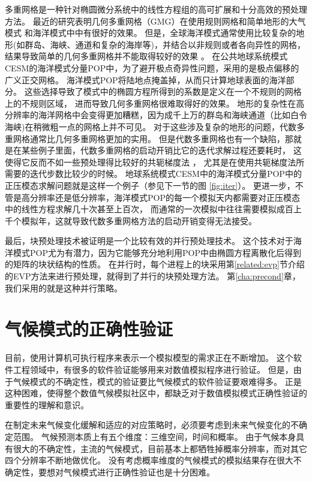 多重网格是一种针对椭圆微分系统中的线性方程组的高可扩展和十分高效的预处理方法。 
最近的研究表明几何多重网格（GMG）在使用规则网格和简单地形的大气模式
 \cite{muller2014massively}和海洋模式中\cite{matsumura2008non,kanarska2007algorithm}中有很好的效果。 
但是，全球海洋模式通常使用比较复杂的地形(如群岛、海峡、通道和复杂的海岸等)，并结合以非规则或者各向异性的网格， 结果导致简单的几何多重网格并不能取得较好的效果
\cite{matsumura2008non,fulton1986multigrid,tseng2003ghost,stuben2001review}。 
在公共地球系统模式CESM的海洋模式分量POP中，为了避开极点奇异性问题，采用的是极点偏移的广义正交网格。 
海洋模式POP将陆地点掩盖掉，从而只计算地球表面的海洋部分。
这些选择导致了模式中的椭圆方程所得到的系数是定义在一个不规则的网格上的不规则区域， 进而导致几何多重网格很难取得好的效果。 
地形的复杂性在高分辨率的海洋网格中会变得更加糟糕，因为成千上万的群岛和海峡通道（比如白令海峡)在稍微粗一点的网格上并不可见。
对于这些涉及复杂的地形的问题，代数多重网格通常比几何多重网格更加的实用。 
但是代数多重网格也有一个缺陷，那就是在某些例子里面，代数多重网格的启动开销比它的迭代求解过程还要耗时，
这使得它反而不如一些预处理得比较好的共轭梯度法
\cite{muller2014massively}， 尤其是在使用共轭梯度法所需要的迭代步数比较少的时候。 
地球系统模式CESM中的海洋模式分量POP中的正压模态求解问题就是这样一个例子（参见下一节的图
 \ref{fig:iter}）。
更进一步，不管是高分辨率还是低分辨率，海洋模式POP的每一个模拟天内都需要对正压模态中的线性方程求解几十次甚至上百次，
而通常的一次模拟中往往需要模拟成百上千个模拟年，这就导致代数多重网格方法的启动开销变得无法接受。


最后，块预处理技术被证明是一个比较有效的并行预处理技术\cite{concus1985block, white2011block}。
这个技术对于海洋模式POP尤为有潜力，因为它能够充分地利用POP中由椭圆方程离散化后得到的矩阵的块状结构的性质。
在并行时，每个进程上的块采用第\ref{related:evp}节介绍的EVP方法来进行预处理，就得到了并行的块预处理方法。
第\ref{cha:precond}章，我们采用的就是这种并行策略。

\section{气候模式的正确性验证}
\label{related:verify}

目前，使用计算机可执行程序来表示一个模拟模型的需求正在不断增加。 
这个软件工程领域中，有很多的软件验证能够用来对数值模拟程序进行验证。
但是，由于气候模式的不确定性，模式的验证要比气候模式的软件验证要艰难得多。
正是这种困难，使得整个数值气候模拟社区中，都缺乏对于数值模拟模式正确性验证的重要性的理解和意识\cite{whitner1989guidelines}。 


在制定未来气候变化缓解和适应的对应策略时，必须要考虑到未来气候变化的不确定范围。
气候预测本质上有五个维度：三维空间，时间和概率。 
由于气候本身具有很大的不确定性，主流的气候模式，目前基本上都牺牲掉概率分辨率，而对其它四个分辨率不断地做优化。
没有考虑概率维度的气候模式的模拟结果存在很大不确定性，要想对气候模式进行正确性验证也是十分困难\cite{whitner1989guidelines}。

